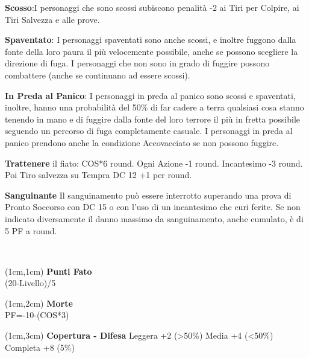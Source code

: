 \documentclass[a4paper,12 pt,openany]{book}
\begin{document}
\begin{textblock*}{19 cm}
\begin{multicols}{2}
\textbf{Scosso}:I personaggi che sono scossi subiscono penalità -2 ai Tiri per Colpire, ai Tiri Salvezza e alle prove.
			
\textbf{Spaventato}: I personaggi spaventati sono anche scossi, e inoltre fuggono dalla fonte della loro paura il più velocemente possibile, anche se possono scegliere la direzione di fuga.
I personaggi che non sono in grado di fuggire possono combattere (anche se continuano ad essere scossi).
			
\textbf{In Preda al Panico}: I personaggi in preda al panico sono scossi e spaventati, inoltre, hanno una probabilità del 50\% di far cadere a terra qualsiasi cosa stanno tenendo in mano e di fuggire dalla fonte del loro terrore il più in fretta possibile seguendo un percorso di fuga completamente casuale.
I personaggi in preda al panico prendono anche la condizione Accovacciato se non possono fuggire.
			
\textbf{Trattenere} il fiato: COS*6 round. Ogni Azione -1 round. Incantesimo -3 round. Poi Tiro salvezza su Tempra DC 12 +1 per round.
			
\textbf{Sanguinante} Il sanguinamento può essere interrotto superando una prova di Pronto Soccorso con DC 15 o con l'uso di un incantesimo che curi ferite.
Se non indicato diversamente il danno massimo da sanguinamento, anche cumulato, è di 5 PF a round.
\end{multicols}
		
	\end{textblock*}
	
	~\newpage
	
	\begin{textblock*}{4cm}(1cm,1cm) %
		{\textbf{Punti Fato}\\
			\footnotesize 
			(20-Livello)/5}
	\end{textblock*}	
	
	\begin{textblock*}{4cm}(1cm,2cm) %
		{\textbf{Morte}\\
			\footnotesize 
			PF=-10-(COS*3)}
	\end{textblock*}	

\begin{textblock*}{4cm}(1cm,3cm) %
\textbf{Copertura - Difesa}
Leggera +2 (>50\%)
Media +4 (<50\%)
Completa +8 (5\%)	
	\end{textblock*}	
\end{document}
